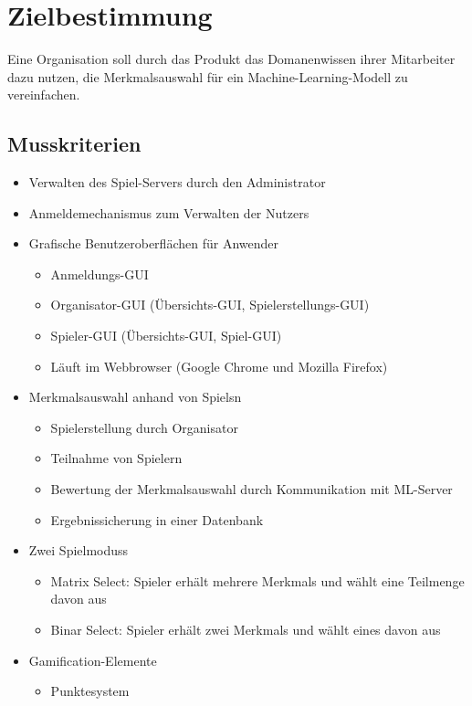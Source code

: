 \documentclass[a4paper]{scrreprt}
\begin{document}
    \chapter{Zielbestimmung}
    Eine Organisation soll durch das \Gls{Produkt} das \Gls{Domanenwissen} ihrer Mitarbeiter dazu nutzen, die Merkmalsauswahl für ein Machine-Learning-Modell zu vereinfachen.



    \section{Musskriterien}
    \begin{itemize} %
        \item Verwalten des \Gls{Spiel-Server}s durch den \Gls{Administrator}
    	\item Anmeldemechanismus zum Verwalten der \Glspl{Nutzer}
	\item Grafische Benutzeroberflächen für Anwender 
        \begin{itemize}
            \item Anmeldungs-GUI
            \item \Gls{Organisator}-GUI (Übersichts-GUI, Spielerstellungs-GUI)
            \item \Gls{Spieler}-GUI (Übersichts-GUI, Spiel-GUI)
            \item Läuft im \Gls{Webbrowser} (Google Chrome und Mozilla Firefox)
        \end{itemize}
        \item Merkmalsauswahl anhand von \Glspl{Spiel}n  %
        \begin{itemize}
            \item Spielerstellung durch \Gls{Organisator}
            \item Teilnahme von \Gls{Spieler}n %
            \item Bewertung der Merkmalsauswahl durch Kommunikation mit \Gls{ML-Server}
            \item Ergebnissicherung in einer Datenbank 
        \end{itemize}
        \item Zwei \Glspl{Spielmodus}
        \begin{itemize}
            \item \Gls{Matrix Select}: \Gls{Spieler} erhält mehrere \Glspl{Merkmal} und wählt eine Teilmenge davon aus %
            \item \Gls{Binar Select}: \Gls{Spieler} erhält zwei \Glspl{Merkmal} und wählt eines davon aus
        \end{itemize}
        \item Gamification-Elemente
        \begin{itemize}
                  \item Punktesystem 
        \end{itemize}
    \end{itemize}
    \newpage %
\end{document}
